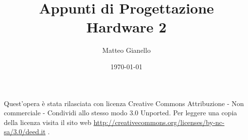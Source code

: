 \documentclass[a4paper,11pt, twoside]{article}
\title{Appunti di Progettazione Hardware 2}
\author{Matteo Gianello}
\date{\today}
\theoremstyle{definition}
\begin{document}
\pagestyle{empty}
\thispagestyle{empty}
\maketitle
\vspace{5cm}
\begin{center}
Quest'opera è stata rilasciata con licenza Creative Commons Attribuzione - Non commerciale - Condividi allo stesso modo 3.0 Unported. Per leggere una copia della licenza visita il sito web \url{http://creativecommons.org/licenses/by-nc-sa/3.0/deed.it} \ccbyncsa.
\end{center}
\newpage

\thispagestyle{plain}
\tableofcontents
\newpage

\pagestyle{plain}

%
%
%
%
\end{document}
